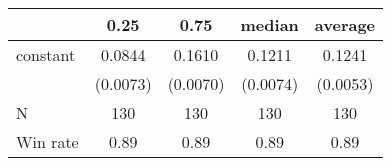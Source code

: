 \begin{tabular}{lcccc}
\hline
         &   0.25   &   0.75   &  median  & average   \\
\midrule
\midrule
constant & 0.0844   & 0.1610   & 0.1211   & 0.1241    \\
         & (0.0073) & (0.0070) & (0.0074) & (0.0053)  \\
N        & 130      & 130      & 130      & 130       \\
Win rate & 0.89     & 0.89     & 0.89     & 0.89      \\
\hline
\end{tabular}